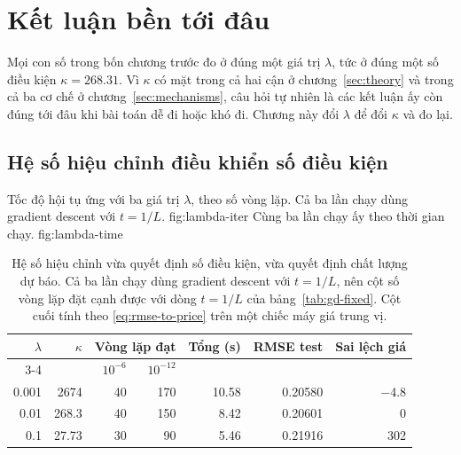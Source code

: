 \chapter{Kết luận bền tới đâu}
\label{sec:lambda}

Mọi con số trong bốn chương trước đo ở đúng một giá trị $\lambda$, tức ở đúng một
số điều kiện $\kappa = \num{268.31}$. Vì $\kappa$ có mặt trong cả hai cận ở
chương~\ref{sec:theory} và trong cả ba cơ chế ở chương~\ref{sec:mechanisms}, câu
hỏi tự nhiên là các kết luận ấy còn đúng tới đâu khi bài toán dễ đi hoặc khó đi.
Chương này đổi $\lambda$ để đổi $\kappa$ và đo lại.

\section{Hệ số hiệu chỉnh điều khiển số điều kiện}
\label{sec:lambda-control}

  {Tốc độ hội tụ ứng với ba giá trị $\lambda$, theo số vòng lặp. Cả ba lần chạy
   dùng gradient descent với $t = 1/L$.}
  {fig:lambda-iter}
  {Cùng ba lần chạy ấy theo thời gian chạy.}
  {fig:lambda-time}

\begin{table}[tp]
  \centering
  \caption{Hệ số hiệu chỉnh vừa quyết định số điều kiện, vừa quyết định chất
    lượng dự báo. Cả ba lần chạy dùng gradient descent với $t = 1/L$, nên cột số
    vòng lặp đặt cạnh được với dòng $t = 1/L$ của bảng~\ref{tab:gd-fixed}. Cột
    cuối tính theo \eqref{eq:rmse-to-price} trên một chiếc máy giá trung vị.}
  \label{tab:lambda}
  \begin{tabular}{rrrrrrr}
    \toprule
    $\lambda$ & $\kappa$ & \multicolumn{2}{c}{Vòng lặp đạt}
      & Tổng (s) & RMSE test & Sai lệch giá \\
    \cmidrule(lr){3-4}
    & & $10^{-6}$ & $10^{-12}$ & & & \\
    \midrule
    \num{0.001} & \num{2674}  & 40 & 170 & \num{10.58} & \num{0.20580} & \num{-4.8}  \\
    \num{0.01}  & \num{268.3} & 40 & 150 & \num{8.42}  & \num{0.20601} & \num{0}     \\
    \num{0.1}   & \num{27.73} & 30 & 90  & \num{5.46}  & \num{0.21916} & \num{302}   \\
    \bottomrule
  \end{tabular}
\end{table}

